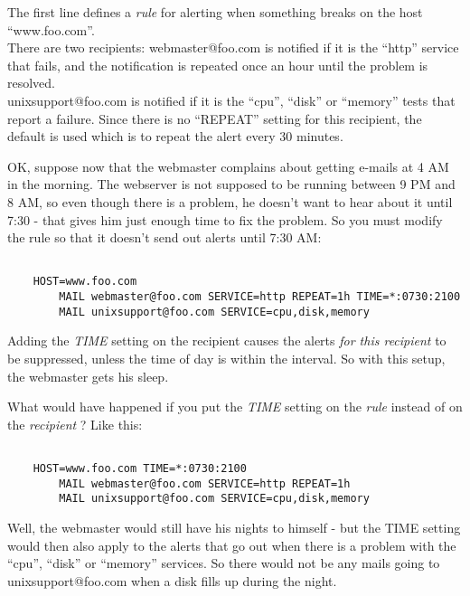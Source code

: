  The first line defines a \emph{rule}
 for alerting when something breaks on the host ``www.foo.com''.\\ 
 There are two recipients: webmaster@foo.com is notified if it is the
 ``http'' service that fails, and the notification is repeated once an
 hour until the problem is resolved.\\ 

unixsupport@foo.com is notified if it is the ``cpu'', ``disk'' or
``memory'' tests that report a failure. Since there is no ``REPEAT''
setting for this recipient, the default is used which is to repeat the
alert every 30 minutes.



 OK, suppose now that the webmaster complains about getting e-mails at
 4 AM in the morning. The webserver is not supposed to be running
 between 9 PM and 8 AM, so even though there is a problem, he doesn't
 want to hear about it until 7:30 - that gives him just enough time to
 fix the problem. So you must modify the rule so that it doesn't send
 out alerts until 7:30 AM:

\begin{verbatim}

	HOST=www.foo.com
		MAIL webmaster@foo.com SERVICE=http REPEAT=1h TIME=*:0730:2100
		MAIL unixsupport@foo.com SERVICE=cpu,disk,memory

\end{verbatim}


 Adding the \emph{TIME}
 setting on the recipient causes the alerts \emph{for this recipient}
 to be suppressed, unless the time of day is within the interval. So
 with this setup, the webmaster gets his sleep.



 What would have happened if you put the \emph{TIME}
 setting on the \emph{rule}
 instead of on the \emph{recipient}
 ? Like this: \begin{verbatim}

	HOST=www.foo.com TIME=*:0730:2100
		MAIL webmaster@foo.com SERVICE=http REPEAT=1h
		MAIL unixsupport@foo.com SERVICE=cpu,disk,memory

\end{verbatim}



 Well, the webmaster would still have his nights to himself - but the TIME setting would then also apply to the alerts that go out when there is a problem with the ``cpu'', ``disk'' or ``memory'' services. So there would not be any mails going to unixsupport@foo.com when a disk fills up during the night.
